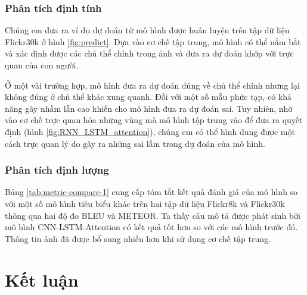 \documentclass[conference]{IEEEtran}
\begin{document}
\subsubsection{Phân tích định tính}
Chúng em đưa ra ví dụ dự đoán từ mô hình được huấn luyện trên tập dữ liệu Flickr30k ở hình \ref{fig:predict}. Dựa vào cơ chế tập trung, mô hình có thể nắm bắt và xác định được các chủ thể chính trong ảnh và đưa ra dự đoán khớp với trực quan của con người.

Ở một vài trường hợp, mô hình đưa ra dự đoán đúng về chủ thể chính nhưng lại không đúng ở chủ thể khác xung quanh. Đối với một số mẫu phức tạp, có khả năng gây nhầm lẫn cao khiến cho mô hình đưa ra dự đoán sai. Tuy nhiên, nhờ vào cơ chế trực quan hóa những vùng mà mô hình tập trung vào để đưa ra quyết định (hình \ref{fig:RNN_LSTM_attention}), chúng em có thể hình dung được một cách trực quan lý do gây ra những sai lầm trong dự đoán của mô hình.

\subsubsection{Phân tích định lượng}
Bảng \ref{tab:metric-compare-1} cung cấp tóm tắt kết quả đánh giá của mô hình so với một số mô hình tiêu biểu khác trên hai tập dữ liệu Flickr8k và Flickr30k thông qua hai độ đo BLEU và METEOR.
Ta thấy câu mô tả được phát sinh bởi mô hình CNN-LSTM-Attention có kết quả tốt hơn so với các mô hình trước đó.
Thông tin ảnh đã được bổ sung nhiều hơn khi sử dụng cơ chế tập trung.

\section{Kết luận}


\renewcommand{\refname}{Tài liệu tham khảo}


\end{document}
